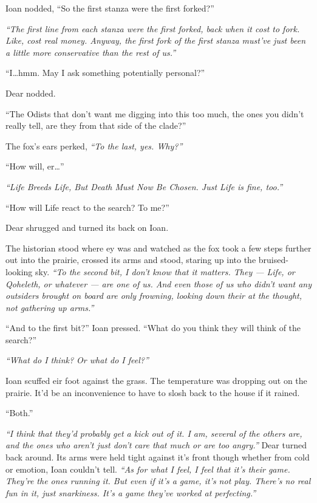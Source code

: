 Ioan nodded, ``So the first stanza were the first forked?''

\emph{``The first line from each stanza were the first forked, back when it cost to fork. Like, cost real money. Anyway, the first fork of the first stanza must've just been a little more conservative than the rest of us.''}

``I\ldots{}hmm. May I ask something potentially personal?''

Dear nodded.

``The Odists that don't want me digging into this too much, the ones you didn't really tell, are they from that side of the clade?''

The fox's ears perked, \emph{``To the last, yes. Why?''}

``How will, er\ldots{}''

\emph{``Life Breeds Life, But Death Must Now Be Chosen. Just Life is fine, too.''}

``How will Life react to the search? To me?''

Dear shrugged and turned its back on Ioan.

The historian stood where ey was and watched as the fox took a few steps further out into the prairie, crossed its arms and stood, staring up into the bruised-looking sky. \emph{``To the second bit, I don't know that it matters. They --- Life, or Qoheleth, or whatever --- are one of us. And even those of us who didn't want any outsiders brought on board are only frowning, looking down their at the thought, not gathering up arms.''}

``And to the first bit?'' Ioan pressed. ``What do you think they will think of the search?''

\emph{``What do I think? Or what do I feel?''}

Ioan scuffed eir foot against the grass. The temperature was dropping out on the prairie. It'd be an inconvenience to have to slosh back to the house if it rained.

``Both.''

\emph{``I think that they'd probably get a kick out of it. I am, several of the others are, and the ones who aren't just don't care that much or are too angry.''} Dear turned back around. Its arms were held tight against it's front though whether from cold or emotion, Ioan couldn't tell. \emph{``As for what I feel, I feel that it's their game. They're the ones running it. But even if it's a game, it's not play. There's no real fun in it, just snarkiness. It's a game they've worked at perfecting.''}

